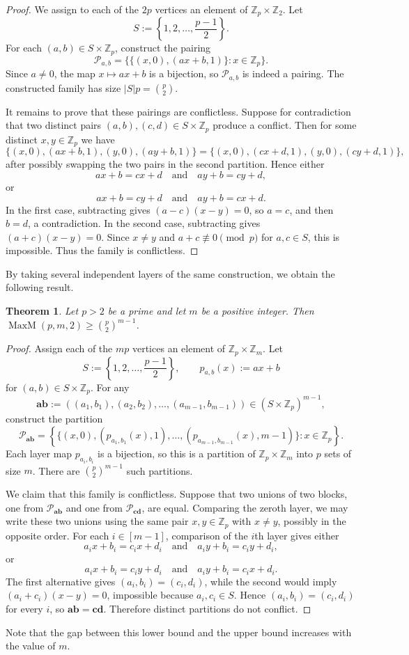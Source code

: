 \documentclass[12pt,UKenglish]{amsart}
\newtheorem{thm}{Theorem}[section]
\theoremstyle{plain}
\theoremstyle{definition}
\theoremstyle{remark}
\begin{document}
\begin{proof}
  We assign to each of the $2p$ vertices an element of $\mathbb{Z}_p\times \mathbb{Z}_2$.
 Let
 \[
 S:=\left\{1,2,\dots,\frac{p-1}{2}\right\}.
 \]
 For each $(a,b)\in S\times\mathbb{Z}_p$, construct the pairing
  \[
  \mathcal{P}_{a,b}=\bigl\{\{(x,0),(ax+b,1)\}:x\in\mathbb{Z}_p\bigr\}.
  \]
 Since $a\neq0$, the map $x\mapsto ax+b$ is a bijection, so $\mathcal{P}_{a,b}$ is indeed a pairing. The constructed family has size $|S|p=\binom{p}{2}$.

 It remains to prove that these pairings are conflictless. Suppose for contradiction that two distinct pairs $(a,b),(c,d)\in S\times\mathbb{Z}_p$ produce a conflict. Then for some distinct $x,y\in\mathbb{Z}_p$ we have
 \[
 \{(x,0),(ax+b,1),(y,0),(ay+b,1)\}
 =
 \{(x,0),(cx+d,1),(y,0),(cy+d,1)\},
 \]
 after possibly swapping the two pairs in the second partition. Hence either
 \[
 ax+b=cx+d\quad\text{and}\quad ay+b=cy+d,
 \]
 or
 \[
 ax+b=cy+d\quad\text{and}\quad ay+b=cx+d.
 \]
 In the first case, subtracting gives $(a-c)(x-y)=0$, so $a=c$, and then $b=d$, a contradiction. In the second case, subtracting gives $(a+c)(x-y)=0$. Since $x\neq y$ and $a+c\not\equiv0\pmod p$ for $a,c\in S$, this is impossible. Thus the family is conflictless.
 \end{proof}
By taking several independent layers of the same construction, we obtain the following result.
 \begin{thm}\label{thm:maxm-prime}
  Let $p>2$ be a prime and let $m$ be a positive integer. Then $\operatorname{MaxM}(p,m,2)\ge\binom{p}{2}^{m-1}$.
 \end{thm}
\begin{proof}
Assign each of the $mp$ vertices an element of $\mathbb{Z}_p\times\mathbb{Z}_m$.
 Let
 \[
 S:=\left\{1,2,\dots,\frac{p-1}{2}\right\},
 \qquad p_{a,b}(x):=ax+b
 \]
 for $(a,b)\in S\times\mathbb{Z}_p$.
 For any
\[
\mathbf{ab}:=((a_1,b_1),(a_2,b_2),\dots,(a_{m-1},b_{m-1}))
\in (S\times \mathbb{Z}_p)^{m-1},
\]
construct the partition
\[
\mathcal{P}_{\mathbf{ab}}
=
\left\{
\{(x,0),(p_{a_1,b_1}(x),1),\dots,(p_{a_{m-1},b_{m-1}}(x),m-1)\}:x\in\mathbb{Z}_p
\right\}.
\]
Each layer map $p_{a_i,b_i}$ is a bijection, so this is a partition of $\mathbb{Z}_p\times\mathbb{Z}_m$ into $p$ sets of size $m$. There are $\binom{p}{2}^{m-1}$ such partitions.

We claim that this family is conflictless. Suppose that two unions of two blocks, one from $\mathcal{P}_{\mathbf{ab}}$ and one from $\mathcal{P}_{\mathbf{cd}}$, are equal. Comparing the zeroth layer, we may write these two unions using the same pair $x,y\in\mathbb{Z}_p$ with $x\neq y$, possibly in the opposite order. For each $i\in[m-1]$, comparison of the $i$th layer gives either
\[
a_i x+b_i=c_i x+d_i\quad\text{and}\quad a_i y+b_i=c_i y+d_i,
\]
or
\[
a_i x+b_i=c_i y+d_i\quad\text{and}\quad a_i y+b_i=c_i x+d_i.
\]
The first alternative gives $(a_i,b_i)=(c_i,d_i)$, while the second would imply $(a_i+c_i)(x-y)=0$, impossible because $a_i,c_i\in S$. Hence $(a_i,b_i)=(c_i,d_i)$ for every $i$, so $\mathbf{ab}=\mathbf{cd}$. Therefore distinct partitions do not conflict.
 \end{proof}
Note that the gap between this lower bound and the upper bound increases with the value of $m$.
\end{document}
